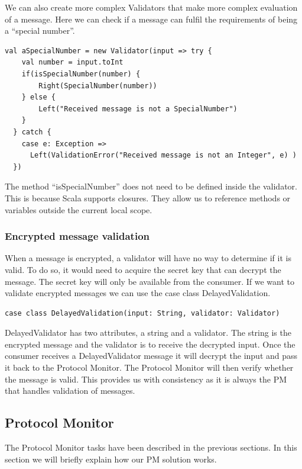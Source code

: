 We can also create more complex Validators that make more complex evaluation of a message. Here we can check if a message can fulfil the requirements of being a ``special number''.
\begin{lstlisting}[style=myScalastyle]
  val aSpecialNumber = new Validator(input => try {
    val number = input.toInt
    if(isSpecialNumber(number) {
        Right(SpecialNumber(number))
    } else {
        Left("Received message is not a SpecialNumber") 
    }
  } catch {
    case e: Exception =>
      Left(ValidationError("Received message is not an Integer", e) )
  })
\end{lstlisting}
The method ``isSpecialNumber'' does not need to be defined inside the validator. This is because Scala supports closures. They allow us to reference methods or variables outside the current local scope.

\subsubsection{Encrypted  message validation}
When a message is encrypted, a validator will have no way to determine if it is valid. To do so, it would need to acquire the secret key that can decrypt the message. The secret key will only be available from the consumer. If we want to validate encrypted messages we can use the case class DelayedValidation.
 
\begin{lstlisting}[style=myScalastyle]
case class DelayedValidation(input: String, validator: Validator)
\end{lstlisting}

DelayedValidator has two attributes, a string and a validator. The string is the encrypted message and the validator is to receive the decrypted input. Once the consumer receives a DelayedValidator message it will decrypt the input and pass it back to the Protocol Monitor. The Protocol Monitor will then verify whether the message is valid. This provides us with consistency as it is always the PM that handles validation of messages.
   
%


\subsection{Protocol Monitor}
The Protocol Monitor tasks have been described in the previous sections. In this section we will briefly explain how our PM solution works.

